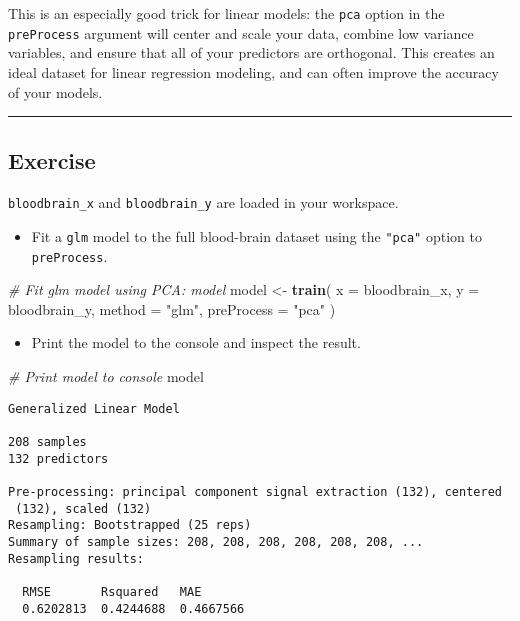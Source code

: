 \documentclass[
]{book}
\newenvironment{Shaded}{\begin{snugshade}}{\end{snugshade}}
\newcommand{\CommentTok}[1]{\textcolor[rgb]{0.56,0.35,0.01}{\textit{#1}}}
\newcommand{\DataTypeTok}[1]{\textcolor[rgb]{0.13,0.29,0.53}{#1}}
\newcommand{\KeywordTok}[1]{\textcolor[rgb]{0.13,0.29,0.53}{\textbf{#1}}}
\newcommand{\NormalTok}[1]{#1}
\newcommand{\StringTok}[1]{\textcolor[rgb]{0.31,0.60,0.02}{#1}}
\providecommand{\tightlist}{%
  \setlength{\itemsep}{0pt}\setlength{\parskip}{0pt}}
\begin{document}
This is an especially good trick for linear models: the \texttt{pca} option in the \texttt{preProcess} argument will center and scale your data, combine low variance variables, and ensure that all of your predictors are orthogonal. This creates an ideal dataset for linear regression modeling, and can often improve the accuracy of your models.

\begin{center}\rule{0.5\linewidth}{0.5pt}\end{center}

\hypertarget{exercise-28}{%
\subsection*{Exercise}\label{exercise-28}}

\texttt{bloodbrain\_x} and \texttt{bloodbrain\_y} are loaded in your workspace.

\begin{itemize}
\tightlist
\item
  Fit a \texttt{glm} model to the full blood-brain dataset using the \texttt{"pca"} option to \texttt{preProcess}.
\end{itemize}

\begin{Shaded}
\begin{Highlighting}[]
\CommentTok{# Fit glm model using PCA: model}
\NormalTok{model <-}\StringTok{ }\KeywordTok{train}\NormalTok{(}
  \DataTypeTok{x =}\NormalTok{ bloodbrain_x, }\DataTypeTok{y =}\NormalTok{ bloodbrain_y,}
  \DataTypeTok{method =} \StringTok{"glm"}\NormalTok{, }\DataTypeTok{preProcess =} \StringTok{"pca"}
\NormalTok{)}
\end{Highlighting}
\end{Shaded}

\begin{itemize}
\tightlist
\item
  Print the model to the console and inspect the result.
\end{itemize}

\begin{Shaded}
\begin{Highlighting}[]
\CommentTok{# Print model to console}
\NormalTok{model}
\end{Highlighting}
\end{Shaded}

\begin{verbatim}
Generalized Linear Model 

208 samples
132 predictors

Pre-processing: principal component signal extraction (132), centered
 (132), scaled (132) 
Resampling: Bootstrapped (25 reps) 
Summary of sample sizes: 208, 208, 208, 208, 208, 208, ... 
Resampling results:

  RMSE       Rsquared   MAE      
  0.6202813  0.4244688  0.4667566
\end{verbatim}
\end{document}
